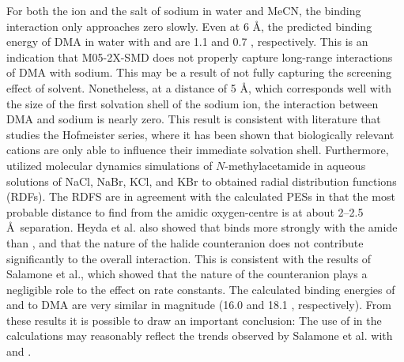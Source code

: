 \begin{doublespace}
For both the ion and the salt of sodium in water and MeCN, the binding
interaction only approaches zero slowly. Even at 6 \AA, the predicted binding
energy of DMA in water with  and  are 1.1 and 0.7 \kcalmol,
respectively. This is an indication that M05-2X-SMD does not properly capture
long-range interactions of DMA with sodium. This may be a result of not fully
capturing the screening effect of solvent. Nonetheless, at a distance of 5 \AA,
which corresponds well with the size of the first solvation shell of the sodium
ion,\cite{Degreve1996} the interaction between DMA and sodium is nearly zero.
This result is consistent with literature that studies the Hofmeister series,
where it has been shown that biologically relevant cations are only able to
influence their immediate solvation shell.\cite{Omta2003, Funkner2011}
Furthermore, \citet{Heyda2009} utilized molecular dynamics simulations of
$N$-methylacetamide in aqueous solutions of NaCl, NaBr, KCl, and KBr to obtained
radial distribution functions (RDFs). The RDFS are in agreement with the
calculated PESs in that the most probable distance to find  from the
amidic oxygen-centre is at about 2--2.5 \AA\ separation. Heyda et al. also
showed that  binds more strongly with the amide than , and that
the nature of the halide counteranion does not contribute significantly to the
overall interaction. This is consistent with the results of Salamone et al.,
which showed that the nature of the counteranion plays a negligible role to the
effect on rate constants.\cite{Salamone2013a} The calculated binding energies of
 and  to DMA are very similar in magnitude (16.0 and 18.1
\kcalmol, respectively). From these results it is possible to draw an important
conclusion: The use of  in the calculations may reasonably reflect the
trends observed by Salamone et al.  with  and .


\end{doublespace}
